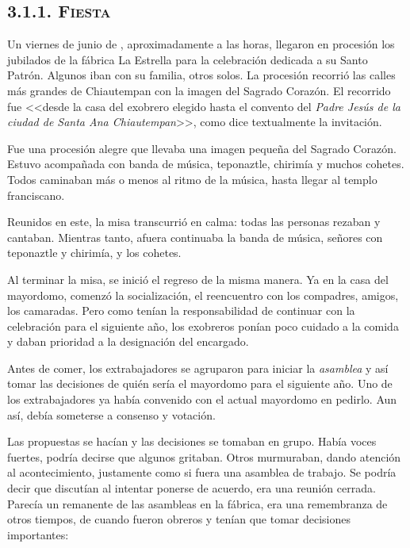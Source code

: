 \documentclass[14pt,letterpaper,twoside]{extbook} %
\begin{document}
\subsection*{\mdseries\large\textsc{3.1.1. Fiesta }}\label{Fiesta_1989}

\noindent Un viernes de junio de , aproximadamente a las  horas, llegaron en procesión los jubilados de la fábrica La Estrella para la celebración dedicada a su Santo Patrón. Algunos iban con su familia, otros solos. La procesión recorrió las calles más grandes de Chiautempan con la imagen del Sagrado Corazón. El recorrido fue <<desde la casa del exobrero elegido hasta el convento del \textit{Padre Jesús de la ciudad de Santa Ana Chiautempan}>>, como dice textualmente la invitación.

Fue una procesión alegre que llevaba una imagen pequeña del Sagrado Corazón. Estuvo acompañada con banda de música, teponaztle, chirimía y muchos cohetes. Todos caminaban más o menos al ritmo de la música, hasta llegar al templo franciscano.

Reunidos en este, la misa transcurrió en calma: todas las personas rezaban y cantaban. Mientras tanto, afuera continuaba la banda de música, señores con teponaztle y chirimía, y los cohetes.

Al terminar la misa, se inició el regreso de la misma manera. Ya en la casa del mayordomo, comenzó la socialización, el reencuentro con los compadres, amigos, los camaradas. Pero como tenían la responsabilidad de continuar con la celebración para el siguiente año, los exobreros ponían poco cuidado a la comida y daban prioridad a la designación del encargado.

Antes de comer, los extrabajadores se agruparon para iniciar la \textit{asamblea} y así tomar las decisiones de quién sería el mayordomo para el siguiente año. Uno de los extrabajadores ya había convenido con el actual mayordomo en pedirlo. Aun así, debía someterse a consenso y votación.

Las propuestas se hacían y las decisiones se tomaban en grupo. Había voces fuertes, podría decirse que algunos gritaban. Otros murmuraban, dando atención al acontecimiento, justamente como si fuera una asamblea de trabajo. Se podría decir que discutían al intentar ponerse de acuerdo, era una reunión cerrada. Parecía un remanente de las asambleas en la fábrica, era una remembranza de otros tiempos, de cuando fueron obreros y tenían que tomar decisiones importantes:
\end{document}
